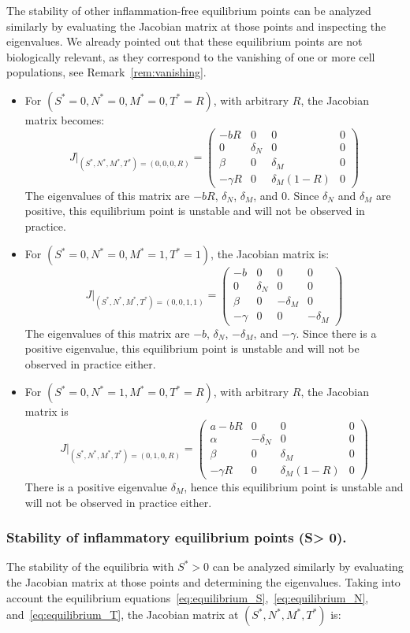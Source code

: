 \documentclass[a4paper, 12pt]{article}
\begin{document}
The stability of other inflammation-free equilibrium points can be analyzed similarly by evaluating the Jacobian matrix at those points and inspecting the eigenvalues. 
We already pointed out that  these equilibrium points are not biologically relevant, as they correspond to the vanishing of one or more cell populations, see Remark~\ref{rem:vanishing}.
\begin{itemize}
\item For $(S^* = 0, N^* = 0, M^* = 0, T^* = R)$, with arbitrary $R$, the Jacobian matrix becomes:
\[
J|_{(S^*, N^*, M^*, T^*) = (0, 0, 0, R)} =
\begin{pmatrix}
- b R & 0 & 0 & 0 \\
0 & \delta_N & 0 & 0 \\
\beta & 0 & \delta_M & 0 \\
-\gamma R & 0 & \delta_M (1 - R) & 0
\end{pmatrix}
\]
The eigenvalues of this matrix are $-b R$, $\delta_N$, $\delta_M$, and $0$. Since $\delta_N$ and $\delta_M$ are positive, this equilibrium point is unstable and will not be observed in practice. 

\item For $(S^* = 0, N^* = 0, M^* = 1, T^* = 1)$, the Jacobian matrix is:
\[
J|_{(S^*, N^*, M^*, T^*) = (0, 0, 1, 1)} =
\begin{pmatrix}
-b & 0 & 0 & 0 \\
0 & \delta_N & 0 & 0 \\
\beta & 0 & -\delta_M & 0 \\
-\gamma & 0 & 0 & -\delta_M
\end{pmatrix}
\]
The eigenvalues of this matrix are $-b$, $\delta_N$, $-\delta_M$, and $-\gamma$. Since there is a positive eigenvalue, this equilibrium point is unstable and will not be observed in practice either.
\item For $(S^* = 0, N^* = 1, M^* = 0, T^* = R)$, with arbitrary $R$, the Jacobian matrix is
\[
J|_{(S^*, N^*, M^*, T^*) = (0, 1, 0, R)} =
\begin{pmatrix}
a - b R & 0 & 0 & 0 \\
\alpha & -\delta_N & 0 & 0 \\
\beta & 0 & \delta_M & 0 \\
-\gamma R & 0 & \delta_M (1 - R) & 0
\end{pmatrix}
\]
There is a positive eigenvalue $\delta_M$, hence this equilibrium point is unstable and will not be observed in practice either.
\end{itemize}
\subsubsection{Stability of inflammatory equilibrium points (S> 0).}
The stability of the equilibria with $S^* > 0$ can be analyzed similarly by evaluating the Jacobian matrix at those points and determining the eigenvalues.
Taking into account the equilibrium equations~\eqref{eq:equilibrium_S},~\eqref{eq:equilibrium_N}, and~\eqref{eq:equilibrium_T}, the Jacobian matrix at $(S^*, N^*, M^*, T^*)$ is:
\end{document}
